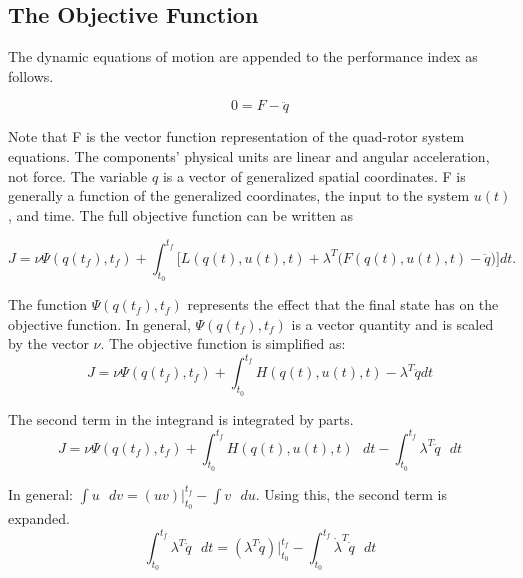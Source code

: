 \subsection{The Objective Function}       

The dynamic equations of motion are appended to the performance index as follows.

\begin{equation}
    0 = F - \ddot{q}
\end{equation}

Note that F is the vector function representation of the quad-rotor system equations. The components' physical units are linear and angular acceleration, not force. The variable $q$ is a vector of generalized spatial coordinates. F is generally a function of the generalized coordinates, the input to the system $u(t)$, and time. The full objective function can be written as


\begin{equation}
    J = \nu \Psi ( q(t_f),t_f ) + \int_{t_0}^{t_f}  \big[ L(q(t),u(t),t) + \lambda^T \big( F(q(t),u(t),t) - \ddot q \big)  \big] dt .
\end{equation}

The function $\Psi ( q(t_f),t_f )$ represents the effect that the final state has on the objective function. In general, $\Psi( q(t_f),t_f )$ is a vector quantity and is scaled by the vector $\nu$.
The objective function is simplified as:\\

\begin{equation}
    J = \nu \Psi ( q(t_f),t_f ) + \int_{t_0}^{t_f}  H(q(t),u(t),t) - \lambda^T \ddot q  dt
\end{equation}

The second term in the integrand is integrated by parts.\\

\begin{equation}
    J = \nu \Psi ( q(t_f),t_f ) + \int_{t_0}^{t_f}  H(q(t),u(t),t) \text{  } dt - \int_{t_0}^{t_f} \lambda^T \ddot q \text{  } dt
\end{equation}

In general:  $\int u \text{  }dv =  (uv)|_{t_0}^{t_f} - \int v \text{  }du $. Using this, the second term is expanded.\\

\begin{equation}
    \int_{t_0}^{t_f} \lambda^T \ddot q \text{  } dt  =  (\lambda^T \dot q) |_{t_0}^{t_f} - \int_{t_0}^{t_f} \dot \lambda^T  \dot q\text{  } dt
\end{equation}

